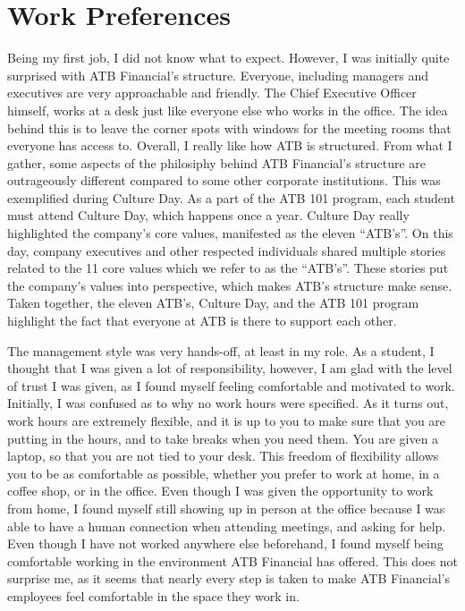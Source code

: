 \documentclass[letterpaper,12pt]{article}
\begin{document}

\section{Work Preferences}

Being my first job, I did not know what to expect.
However, I was initially quite surprised with ATB Financial's structure. Everyone, including managers
and executives are very approachable and friendly. The Chief Executive Officer himself, works at
a desk just like everyone else who works in the office. The idea behind this is to leave the
corner spots with windows for the meeting rooms that everyone has access to. 
Overall, I really like how ATB is structured. From what I gather, some aspects of the philosiphy
behind ATB Financial's structure are outrageously different compared to some other corporate institutions.
This was exemplified during Culture Day.
As a part of the ATB 101 program, each student
must attend Culture Day, which happens once a year. Culture Day really highlighted the company's
core values, manifested as the eleven ``ATB's''\cite{11atb}. On this day, company executives and
other respected individuals shared multiple stories related to the 11 core values which we refer to
as the ``ATB's''. These stories put the company's values into perspective, which makes ATB's structure
make sense. Taken together, the eleven ATB's, Culture Day, and the ATB 101 program
highlight the fact that everyone at ATB is there to support each other.


The management style was very hands-off, at least in my role. As a student,
I thought that I was given a lot of responsibility, however, I am glad
with the level of trust I was given, as I found myself feeling
comfortable and motivated to work.
Initially, I was confused as to why no work hours were specified. As it turns out,
work hours are extremely flexible, and it is up to you to make sure that you are
putting in the hours, and to take breaks when you need them. You are given a laptop, so
that you are not tied to your desk. This freedom of flexibility allows you to be
as comfortable as possible, whether you prefer to work at home, in a coffee shop,
or in the office. Even though I was given the opportunity to work from home,
I found myself still showing up in person at the office
because I was able to have a human connection when attending meetings,
and asking for help. Even though I have not worked
anywhere else beforehand, I found myself being comfortable working in the
environment ATB Financial has offered. This does not surprise me, as it seems
that nearly every step is taken to make ATB Financial's employees feel
comfortable in the space they work in. 
\end{document}
